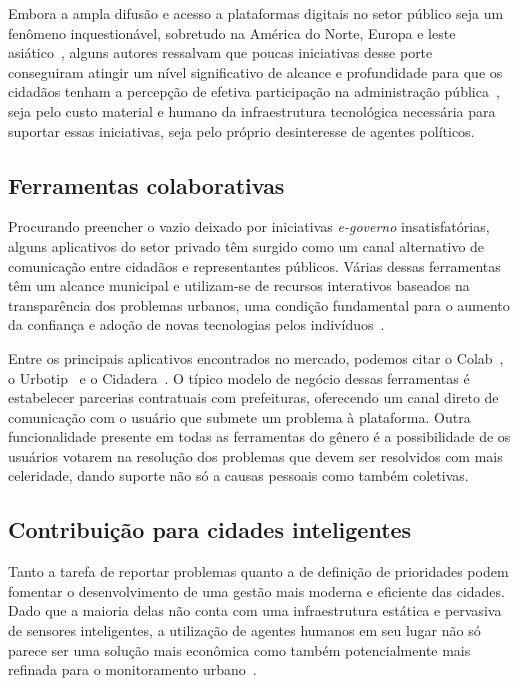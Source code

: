 \documentclass{sigchi}
\begin{document}
Embora a ampla difusão e acesso a plataformas digitais no setor público seja um fenômeno inquestionável, sobretudo na América do Norte, Europa e leste asiático~\cite{nam:2011}, alguns autores ressalvam que poucas iniciativas desse porte conseguiram atingir um nível significativo de alcance e profundidade para que os cidadãos tenham a percepção de efetiva participação na administração pública~\cite{layne:2001}, seja pelo custo material e humano da infraestrutura tecnológica necessária para suportar essas iniciativas, seja pelo próprio desinteresse de agentes políticos.

\subsection{Ferramentas colaborativas}
Procurando preencher o vazio deixado por iniciativas \textit{e-governo} insatisfatórias, alguns aplicativos do setor privado têm surgido como um canal alternativo de comunicação entre cidadãos e representantes públicos. Várias dessas ferramentas têm um alcance municipal e utilizam-se de recursos interativos baseados na transparência dos problemas urbanos, uma condição fundamental para o aumento da confiança e adoção de novas tecnologias pelos indivíduos~\cite{carter:2005}.

Entre os principais aplicativos encontrados no mercado, podemos citar o Colab~\cite{colab:2016}, o Urbotip~\cite{urbotip:2016} e o Cidadera~\cite{cidadera:2016}. O típico modelo de negócio dessas ferramentas é estabelecer parcerias contratuais com prefeituras, oferecendo um canal direto de comunicação com o usuário que submete um problema à plataforma. Outra funcionalidade presente em todas as ferramentas do gênero é a possibilidade de os usuários votarem na resolução dos problemas que devem ser resolvidos com mais celeridade, dando suporte não só a causas pessoais como também coletivas. 

\subsection{Contribuição para cidades inteligentes}
Tanto a tarefa de reportar problemas quanto a de definição de prioridades podem fomentar o desenvolvimento de uma gestão mais moderna e eficiente das cidades. Dado que a maioria delas não conta com uma infraestrutura estática e pervasiva de sensores inteligentes, a utilização de agentes humanos em seu lugar não só parece ser uma solução mais econômica como também potencialmente mais refinada para o monitoramento urbano~\cite{zambonelli:2011}. 
\end{document}
